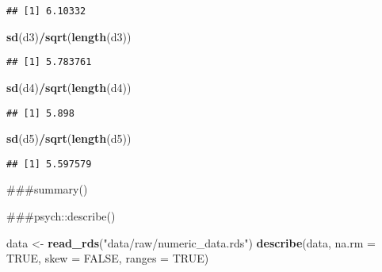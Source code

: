 \documentclass[
]{article}
\newenvironment{Shaded}{\begin{snugshade}}{\end{snugshade}}
\newcommand{\AttributeTok}[1]{\textcolor[rgb]{0.13,0.29,0.53}{#1}}
\newcommand{\ConstantTok}[1]{\textcolor[rgb]{0.56,0.35,0.01}{#1}}
\newcommand{\FunctionTok}[1]{\textcolor[rgb]{0.13,0.29,0.53}{\textbf{#1}}}
\newcommand{\NormalTok}[1]{#1}
\newcommand{\OtherTok}[1]{\textcolor[rgb]{0.56,0.35,0.01}{#1}}
\newcommand{\SpecialCharTok}[1]{\textcolor[rgb]{0.81,0.36,0.00}{\textbf{#1}}}
\newcommand{\StringTok}[1]{\textcolor[rgb]{0.31,0.60,0.02}{#1}}
\begin{document}
\begin{verbatim}
## [1] 6.10332
\end{verbatim}

\begin{Shaded}
\begin{Highlighting}[]
\FunctionTok{sd}\NormalTok{(d3)}\SpecialCharTok{/}\FunctionTok{sqrt}\NormalTok{(}\FunctionTok{length}\NormalTok{(d3))}
\end{Highlighting}
\end{Shaded}

\begin{verbatim}
## [1] 5.783761
\end{verbatim}

\begin{Shaded}
\begin{Highlighting}[]
\FunctionTok{sd}\NormalTok{(d4)}\SpecialCharTok{/}\FunctionTok{sqrt}\NormalTok{(}\FunctionTok{length}\NormalTok{(d4))}
\end{Highlighting}
\end{Shaded}

\begin{verbatim}
## [1] 5.898
\end{verbatim}

\begin{Shaded}
\begin{Highlighting}[]
\FunctionTok{sd}\NormalTok{(d5)}\SpecialCharTok{/}\FunctionTok{sqrt}\NormalTok{(}\FunctionTok{length}\NormalTok{(d5))}
\end{Highlighting}
\end{Shaded}

\begin{verbatim}
## [1] 5.597579
\end{verbatim}

\#\#\#summary()

\#\#\#psych::describe()

\begin{Shaded}
\begin{Highlighting}[]
\NormalTok{data }\OtherTok{\textless{}{-}} \FunctionTok{read\_rds}\NormalTok{(}\StringTok{"data/raw/numeric\_data.rds"}\NormalTok{)}
\FunctionTok{describe}\NormalTok{(data, }\AttributeTok{na.rm =} \ConstantTok{TRUE}\NormalTok{, }\AttributeTok{skew =} \ConstantTok{FALSE}\NormalTok{, }\AttributeTok{ranges =} \ConstantTok{TRUE}\NormalTok{)}
\end{Highlighting}
\end{Shaded}
\end{document}
